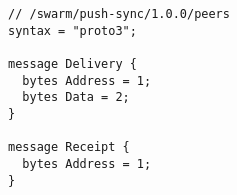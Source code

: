 
\begin{definition}\label{def:push-syncc-messages}

\begin{lstlisting}[]
// /swarm/push-sync/1.0.0/peers
syntax = "proto3";

message Delivery {
  bytes Address = 1;
  bytes Data = 2;
}

message Receipt {
  bytes Address = 1;
}
\end{lstlisting}
\end{definition}
